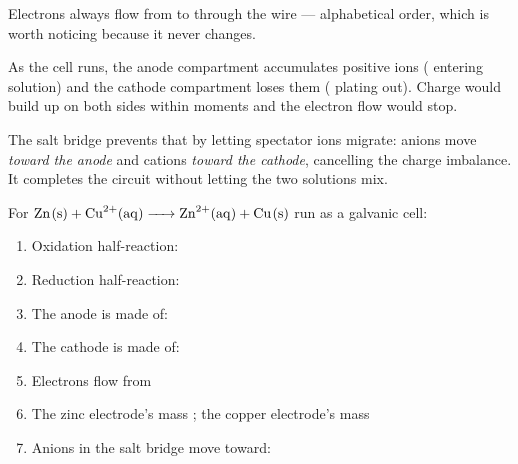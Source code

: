 \documentclass{apchem-notes}
\begin{document}
\begin{center}
\end{center}

Electrons always flow from  to
 through the wire --- alphabetical order, which
is worth noticing because it never changes.

\begin{apcnote}
As the cell runs, the anode compartment accumulates positive ions
( entering solution) and the cathode compartment loses them
( plating out). Charge would build up on both sides within
moments and the electron flow would stop.

The salt bridge prevents that by letting spectator ions migrate: anions move
\emph{toward the anode} and cations \emph{toward the cathode}, cancelling
the charge imbalance. It completes the circuit without letting the two
solutions mix.
\end{apcnote}


For $\ce{Zn(s) + Cu^2+(aq) -> Zn^2+(aq) + Cu(s)}$ run as a galvanic cell:

\begin{enumerate}[leftmargin=*,itemsep=0.35em]
  \item Oxidation half-reaction:
  \item Reduction half-reaction:
  \item The anode is made of: 
  \item The cathode is made of: 
  \item Electrons flow from 
  \item The zinc electrode's mass ; the
        copper electrode's mass 
  \item Anions in the salt bridge move toward:
\end{enumerate}
\end{document}
